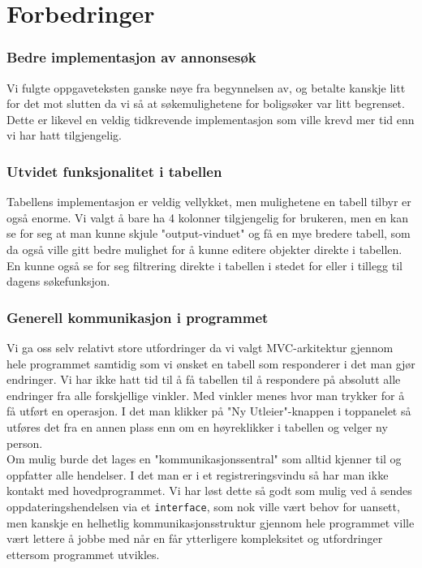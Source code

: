 \section{Forbedringer}

\subsubsection{Bedre implementasjon av annonsesøk}
Vi fulgte oppgaveteksten ganske nøye fra begynnelsen av, og betalte kanskje litt for det mot slutten da vi så at søkemulighetene for boligsøker var litt begrenset.
Dette er likevel en veldig tidkrevende implementasjon som ville krevd mer tid enn vi har hatt tilgjengelig. \\


\subsubsection{Utvidet funksjonalitet i tabellen}
Tabellens implementasjon er veldig vellykket, men mulighetene en tabell tilbyr er også enorme. Vi valgt å bare ha 4 kolonner tilgjengelig for brukeren, men en kan se for seg at man kunne skjule "output-vinduet" og få en mye bredere tabell, som da også ville gitt bedre mulighet for å kunne editere objekter direkte i tabellen. \\
En kunne også se for seg filtrering direkte i tabellen i stedet for eller i tillegg til dagens søkefunksjon.

\subsubsection{Generell kommunikasjon i programmet}
Vi ga oss selv relativt store utfordringer da vi valgt MVC-arkitektur gjennom hele programmet samtidig som vi ønsket en tabell som responderer i det man gjør endringer. Vi har ikke hatt tid til å få tabellen til å respondere på absolutt alle endringer fra alle forskjellige vinkler. Med vinkler menes hvor man trykker for å få utført en operasjon. I det man klikker på "Ny Utleier"-knappen i toppanelet så utføres det fra en annen plass enn om en høyreklikker i tabellen og velger ny person. \\
Om mulig burde det lages en "kommunikasjonssentral" som alltid kjenner til og oppfatter alle hendelser. I det man er i et registreringsvindu så har man ikke kontakt med hovedprogrammet. Vi har løst dette så godt som mulig ved å sendes oppdateringshendelsen via et \texttt{interface}, som nok ville vært behov for uansett, men kanskje en helhetlig kommunikasjonsstruktur gjennom hele programmet ville vært lettere å jobbe med når en får ytterligere kompleksitet og utfordringer ettersom programmet utvikles. \\

